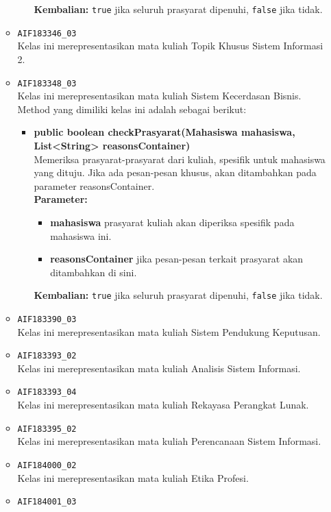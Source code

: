 \begin{enumerate}
\begin{itemize}
\begin{itemize}
\begin{itemize}
			\end{itemize}
			\textbf{Kembalian:} \texttt{true} jika seluruh prasyarat dipenuhi, \texttt{false} jika tidak.
		\end{itemize}
		\item \texttt{AIF183346\_03} \\
		Kelas ini merepresentasikan mata kuliah Topik Khusus Sistem Informasi 2.
		\item \texttt{AIF183348\_03} \\
		Kelas ini merepresentasikan mata kuliah Sistem Kecerdasan Bisnis. Method yang dimiliki kelas ini adalah sebagai berikut: 
		\begin{itemize}
			\item \textbf{public boolean checkPrasyarat(Mahasiswa mahasiswa, List<String> reasonsContainer)}\\
			Memeriksa prasyarat-prasyarat dari kuliah, spesifik untuk mahasiswa yang dituju. Jika ada pesan-pesan khusus, akan ditambahkan pada parameter reasonsContainer.\\
			\textbf{Parameter:}
			\begin{itemize}
				\item \textbf{mahasiswa} prasyarat kuliah akan diperiksa spesifik pada mahasiswa ini.
				\item \textbf{reasonsContainer} jika pesan-pesan terkait prasyarat akan ditambahkan di sini.
			\end{itemize}
			\textbf{Kembalian:} \texttt{true} jika seluruh prasyarat dipenuhi, \texttt{false} jika tidak.
		\end{itemize}
		\item \texttt{AIF183390\_03} \\
		Kelas ini merepresentasikan mata kuliah Sistem Pendukung Keputusan.
		\item \texttt{AIF183393\_02} \\
		Kelas ini merepresentasikan mata kuliah Analisis Sistem Informasi.
		\item \texttt{AIF183393\_04} \\
		Kelas ini merepresentasikan mata kuliah Rekayasa Perangkat Lunak.
		\item \texttt{AIF183395\_02} \\
		Kelas ini merepresentasikan mata kuliah Perencanaan Sistem Informasi.
		\item \texttt{AIF184000\_02} \\
		Kelas ini merepresentasikan mata kuliah Etika Profesi.
		\item \texttt{AIF184001\_03} \\

\end{itemize}
\end{enumerate}
